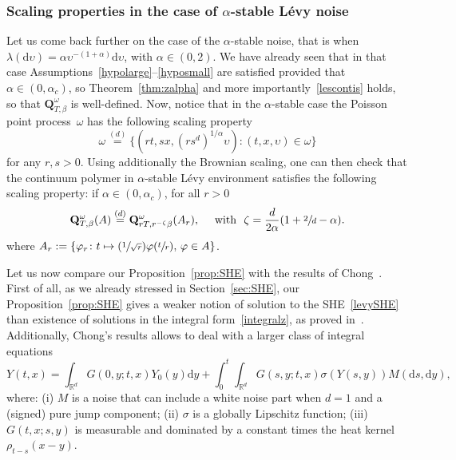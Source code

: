 \documentclass[JEP,XML,SOM,Unicode,published]{cedram}
\let\sep:
\newcommand{\Psfrac}[2]{(\sfrac{#1}{#2})}
\theoremstyle{definition}
\newcommand{\dd}{\mathrm{d}}
\newcommand{\bQ}{{\ensuremath{\mathbf Q}} }
\newcommand{\bbR}{{\ensuremath{\mathbb R}} }
\let\ga\alpha
\let\gb\beta
\let\ups\upsilon
\let\go\omega
\begin{document}
\subsubsection{Scaling properties in the case of $\ga$-stable Lévy noise}
Let us come back further on the case
of the $\alpha$-stable noise,
that is when $\lambda(\dd \ups) = \ga \ups^{-(1+\ga)} \dd \ups$, with $\ga\in (0,2)$.
We have already seen that in that case Assumptions~\eqref{hypolarge}--\eqref{hyposmall} are satisfied provided that $\ga\in (0,\ga_c)$, so Theorem~\ref{thm:zalpha} and more importantly~\eqref{lescontis} holds, so that $\bQ_{T,\gb}^{\go}$ is well-defined.
Now, notice that in the $\ga$-stable case the Poisson point process~$\go$ has the following scaling property\vspace*{-3pt}
\[
\go \stackrel{(d)}{=} \{ (r t, s x, (rs^d)^{1/\ga} \ups) \sep (t,x,\ups)\in \go \}
\]
for any $r,s>0$.
Using additionally the Brownian scaling,
one can then check that
the continuum polymer in $\alpha$-stable Lévy environment
satisfies the following
scaling property: if $\ga\in (0,\ga_c)$, for all $r>0$
\begin{equation}\label{scaling}
\bQ^{\go }_{T, \beta} (A) \stackrel{(d)}{=} \bQ_{r T, r^{-\zeta}\gb }^{\go} (A_r), \quad \text{ with }\ \zeta=\frac{d}{2\ga} (1 +\sfrac{2}{d} - \ga).
\end{equation}
where $A_r := \{ \varphi_r\colon t\mapsto \Psfrac{1}{\sqrt{r}} \varphi(\sfrac{t}{r}),\, \varphi\in A \}$.

Let us now compare our Proposition~\ref{prop:SHE}
with the results of Chong~\cite{Chong17}.
First of all, as we already stressed in Section~\ref{sec:SHE},
our Proposition~\ref{prop:SHE} gives a weaker
notion of solution to the SHE~\eqref{levySHE}
than existence of solutions in the integral form~\eqref{integralz}, as proved in~\cite{Chong17}.
Additionally,
Chong's results allows to deal with a larger class of integral equations
\begin{equation}
\label{SHEchong}
Y(t,x) = \int_{\bbR^d} G(0,y; t,x)Y_0(y)\dd y + \int_0^t \int_{\bbR^d} G(s,y ; t,x) \sigma(Y(s,y)) M(\dd s,\dd y),
\end{equation}
where: (i) $M$ is a noise that can include a white noise part when $d=1$ and a (signed) pure jump component;
(ii) $\sigma$ is a globally Lipschitz function;
(iii) $G(t,x; s,y)$ is measurable and dominated by a constant times the heat kernel $\rho_{t-s}(x-y)$.
\end{document}
